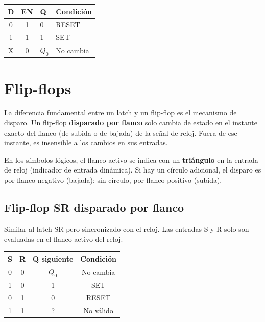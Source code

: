 
\begin{table}[H]
\centering
\begin{tabular}{ccp{2cm}l}
\toprule
D & EN & Q & Condición \\
\midrule
0 & 1 & 0 & RESET \\
1 & 1 & 1 & SET \\
X & 0 & $Q_0$ & No cambia \\
\bottomrule
\end{tabular}
\end{table}

\section{Flip-flops}

La diferencia fundamental entre un latch y un flip-flop es el mecanismo de disparo. Un flip-flop \textbf{disparado por flanco} solo cambia de estado en el instante exacto del flanco (de subida o de bajada) de la señal de reloj. Fuera de ese instante, es insensible a los cambios en sus entradas.

En los símbolos lógicos, el flanco activo se indica con un \textbf{triángulo} en la entrada de reloj (indicador de entrada dinámica). Si hay un círculo adicional, el disparo es por flanco negativo (bajada); sin círculo, por flanco positivo (subida).


\subsection{Flip-flop SR disparado por flanco}

Similar al latch SR pero sincronizado con el reloj. Las entradas S y R solo son evaluadas en el flanco activo del reloj.

\begin{table}[H]
\centering
\begin{tabular}{cccc}
\toprule
S & R & Q siguiente & Condición \\
\midrule
0 & 0 & $Q_0$ & No cambia \\
1 & 0 & 1 & SET \\
0 & 1 & 0 & RESET \\
1 & 1 & ? & No válido \\
\bottomrule
\end{tabular}
\end{table}

